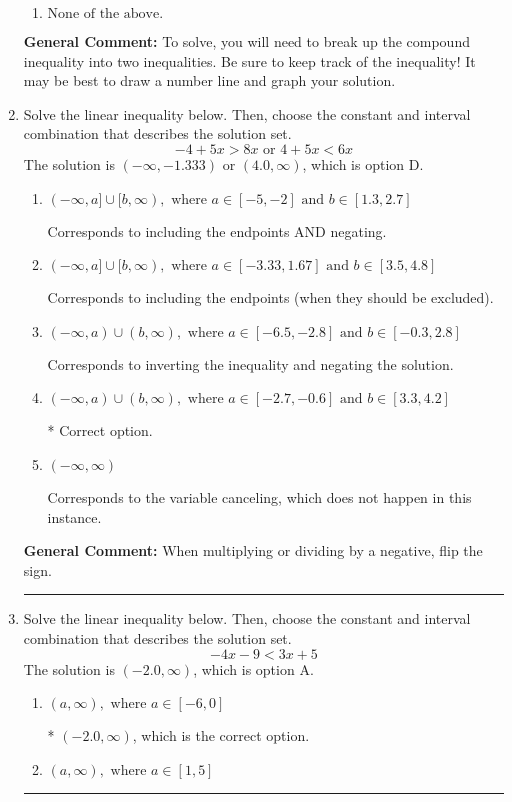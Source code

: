 \documentclass{extbook}[14pt]
\newcommand{\litem}[1]{\item #1

\rule{\textwidth}{0.4pt}}
\begin{document}
\begin{enumerate}
{\begin{enumerate}[label=\Alph*.]
$[-18.50, -7.70)$, which corresponds to flipping the inequality.
\item \( \text{None of the above.} \)


\end{enumerate}

\textbf{General Comment:} To solve, you will need to break up the compound inequality into two inequalities. Be sure to keep track of the inequality! It may be best to draw a number line and graph your solution.
}
\litem{
Solve the linear inequality below. Then, choose the constant and interval combination that describes the solution set.
\[ -4 + 5 x > 8 x \text{ or } 4 + 5 x < 6 x \]The solution is \( (-\infty, -1.333) \text{ or } (4.0, \infty) \), which is option D.\begin{enumerate}[label=\Alph*.]
\item \( (-\infty, a] \cup [b, \infty), \text{ where } a \in [-5, -2] \text{ and } b \in [1.3, 2.7] \)

Corresponds to including the endpoints AND negating.
\item \( (-\infty, a] \cup [b, \infty), \text{ where } a \in [-3.33, 1.67] \text{ and } b \in [3.5, 4.8] \)

Corresponds to including the endpoints (when they should be excluded).
\item \( (-\infty, a) \cup (b, \infty), \text{ where } a \in [-6.5, -2.8] \text{ and } b \in [-0.3, 2.8] \)

Corresponds to inverting the inequality and negating the solution.
\item \( (-\infty, a) \cup (b, \infty), \text{ where } a \in [-2.7, -0.6] \text{ and } b \in [3.3, 4.2] \)

 * Correct option.
\item \( (-\infty, \infty) \)

Corresponds to the variable canceling, which does not happen in this instance.
\end{enumerate}

\textbf{General Comment:} When multiplying or dividing by a negative, flip the sign.
}
\litem{
Solve the linear inequality below. Then, choose the constant and interval combination that describes the solution set.
\[ -4x -9 < 3x + 5 \]The solution is \( (-2.0, \infty) \), which is option A.\begin{enumerate}[label=\Alph*.]
\item \( (a, \infty), \text{ where } a \in [-6, 0] \)

* $(-2.0, \infty)$, which is the correct option.
\item \( (a, \infty), \text{ where } a \in [1, 5] \)


\end{enumerate}}
\end{enumerate}
\end{document}
